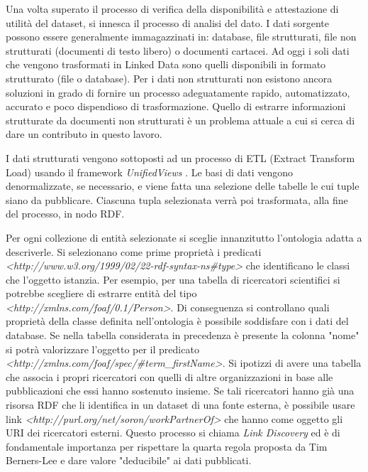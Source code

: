 Una volta superato il processo di verifica della disponibilità e attestazione di utilità del dataset, si innesca il processo di analisi del dato. I dati sorgente possono essere generalmente immagazzinati in: database, file strutturati, file non strutturati (documenti di testo libero) o documenti cartacei. Ad oggi i soli dati che vengono trasformati in Linked Data sono quelli disponibili in formato strutturato (file o database). Per i dati non strutturati non esistono ancora soluzioni in grado di fornire un processo adeguatamente rapido, automatizzato, accurato e poco dispendioso di trasformazione. Quello di estrarre informazioni strutturate da documenti non strutturati è un problema attuale a cui si cerca di dare un contributo in questo lavoro.

I dati strutturati vengono sottoposti ad un processo di ETL (Extract Transform Load) usando il framework \textit{UnifiedViews} \cite{unifiedviews}. Le basi di dati vengono denormalizzate, se 
necessario, e viene fatta una selezione delle tabelle le cui tuple siano da pubblicare. Ciascuna tupla selezionata verrà poi trasformata, alla fine del processo, in nodo RDF.

Per ogni collezione di entità selezionate si sceglie innanzitutto l'ontologia adatta a descriverle. Si selezionano come prime proprietà i predicati \textit{<http://www.w3.org/1999/02/22-rdf-syntax-ns\#type>} che identificano le classi che l'oggetto istanzia. Per esempio, per una tabella di ricercatori scientifici si potrebbe scegliere di estrarre entità del tipo \textit{<http://xmlns.com/foaf/0.1/Person>}. Di conseguenza si controllano quali proprietà della classe definita nell'ontologia è possibile soddisfare con i dati del database. Se nella tabella considerata in precedenza è presente la colonna "nome" si potrà valorizzare l'oggetto per il predicato \textit{<http://xmlns.com/foaf/spec/\#term\_firstName>}. Si ipotizzi di avere una tabella che associa i propri ricercatori con quelli di altre organizzazioni in base alle pubblicazioni che essi hanno sostenuto insieme. Se tali ricercatori hanno già una risorsa RDF che li identifica in un dataset di una fonte esterna, è possibile usare link \textit{<http://purl.org/net/soron/workPartnerOf>} che hanno come oggetto gli URI dei ricercatori esterni. Questo processo si chiama \textit{Link Discovery} ed è di fondamentale importanza per rispettare la quarta regola proposta da Tim Berners-Lee e dare valore "deducibile" ai dati pubblicati.

